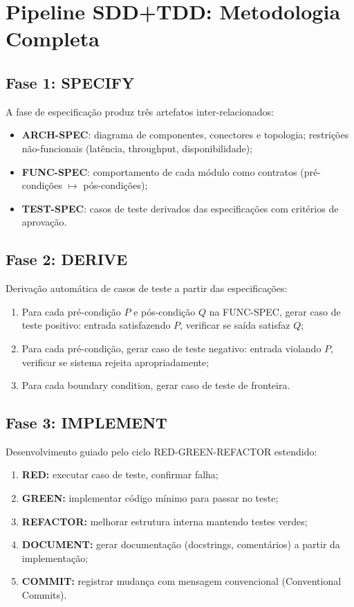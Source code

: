 \documentclass[12pt,a4paper,sumario=tradicional]{abntex2}
\begin{document}
\section{Pipeline SDD+TDD: Metodologia Completa}

\subsection{Fase 1: SPECIFY}

A fase de especificação produz três artefatos inter-relacionados:

\begin{itemize}
    \item \textbf{ARCH-SPEC}: diagrama de componentes, conectores e topologia; restrições não-funcionais (latência, throughput, disponibilidade);
    \item \textbf{FUNC-SPEC}: comportamento de cada módulo como contratos (pré-condições $\mapsto$ pós-condições);
    \item \textbf{TEST-SPEC}: casos de teste derivados das especificações com critérios de aprovação.
\end{itemize}

\subsection{Fase 2: DERIVE}

Derivação automática de casos de teste a partir das especificações:

\begin{enumerate}[leftmargin=*]
    \item Para cada pré-condição $P$ e pós-condição $Q$ na FUNC-SPEC, gerar caso de teste positivo: entrada satisfazendo $P$, verificar se saída satisfaz $Q$;
    \item Para cada pré-condição, gerar caso de teste negativo: entrada violando $P$, verificar se sistema rejeita apropriadamente;
    \item Para cada boundary condition, gerar caso de teste de fronteira.
\end{enumerate}

\subsection{Fase 3: IMPLEMENT}

Desenvolvimento guiado pelo ciclo RED-GREEN-REFACTOR estendido:

\begin{enumerate}[leftmargin=*]
    \item \textbf{RED:} executar caso de teste, confirmar falha;
    \item \textbf{GREEN:} implementar código mínimo para passar no teste;
    \item \textbf{REFACTOR:} melhorar estrutura interna mantendo testes verdes;
    \item \textbf{DOCUMENT:} gerar documentação (docstrings, comentários) a partir da implementação;
    \item \textbf{COMMIT:} registrar mudança com mensagem convencional (Conventional Commits).
\end{enumerate}
\end{document}
